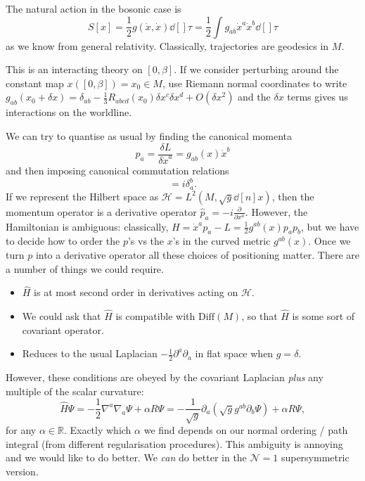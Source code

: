 The natural action in the bosonic case is
\begin{equation}
  S[x] = \frac{1}{2} g (\dot{x}, \dot{x}) \dd[]{\tau} = \frac{1}{2} \int g_{ab} \dot{x}^{a} \dot{x}^{b} \dd[]{\tau}
\end{equation}
as we know from general relativity.
Classically, trajectories are geodesics in $M$.
\begin{remark}
  This is an interacting theory on $[0, \beta]$. If we consider perturbing around the constant map $x([0, \beta]) = x_0 \in M$, use Riemann normal coordinates to write $g_{ab}(x_0 + \delta x) = \delta_{ab} - \frac{1}{3} R_{abcd} (x_0) \delta x^{c} \delta x^{d} + O(\delta x^2)$ and the $\delta x$ terms gives us interactions on the worldline.
\end{remark}
We can try to quantise as usual by finding the canonical momenta
\begin{equation}
  p_a = \frac{\delta L}{\delta \dot{x}^a} = g_{ab}(x) \dot{x}^b
\end{equation}
and then imposing canonical commutation relations
\begin{equation}
  [\hat{p}_a, \hat{x}^b] = i \delta^{b}_a.
\end{equation}
If we represent the Hilbert space as $\mathscr{H} = L^2 (M, \sqrt{g} \dd[n]{x})$, then the momentum operator is a derivative operator $\hat{p}_a = -i \frac{\partial }{\partial x^a}$.
However, the Hamiltonian is ambiguous:
classically, $H = \dot{x}^a p_a - L = \frac{1}{2} g^{ab}(x) p_a p_b$, but we have to decide how to order the $p$'s vs the $x$'s in the curved metric $g^{ab}(x)$.
Once we turn $p$ into a derivative operator all these choices of positioning matter.
There are a number of things we could require.
\begin{itemize}
  \item $\hat{H}$ is at most second order in derivatives acting on $\mathscr{H}$.
  \item We could ask that $\hat{H}$ is compatible with $\text{Diff}(M)$, so that $\hat{H}$ is some sort of covariant operator.
  \item Reduces to the usual Laplacian $-\frac{1}{2} \partial^{a} \partial_{a}$ in flat space when $g = \delta$.
\end{itemize}
However, these conditions are obeyed by the covariant Laplacian \emph{plus} any multiple of the scalar curvature: 
\begin{equation}
  \hat{H} \Psi = - \frac{1}{2} \nabla^a \nabla_a \Psi + \alpha R \Psi = -\frac{1}{\sqrt{g}} \partial_{a} (\sqrt{g} g^{ab} \partial_b \Psi) + \alpha R \Psi,
\end{equation}
for any $\alpha \in \mathbb{R}$.
Exactly which $\alpha$ we find depends on our normal ordering / path integral (from different regularisation procedures).
This ambiguity is annoying and we would like to do better. We \emph{can} do better in the $\mathcal{N} = 1$ supersymmetric version.

